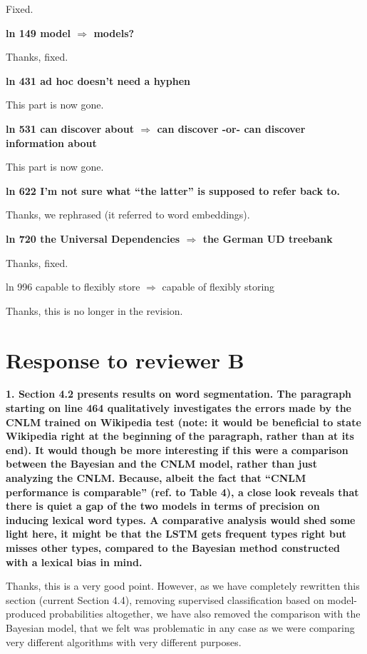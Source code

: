 \documentclass{article}
\begin{document}
Fixed.
\newline

\textbf{ln 149 model $\Rightarrow$ models?}

Thanks, fixed.
\newline

\textbf{ln 431 ad hoc doesn't need a hyphen}

This part is now gone.
\newline

\textbf{ln 531 can discover about $\Rightarrow$ can discover -or- can discover information
about}

This part is now gone.
\newline

\textbf{ln 622 I'm not sure what ``the latter'' is supposed to refer back to.}

Thanks, we rephrased (it referred to word embeddings).
\newline

\textbf{ln 720 the Universal Dependencies $\Rightarrow$ the German UD treebank}

Thanks, fixed.

ln 996 capable to flexibly store $\Rightarrow$ capable of flexibly storing

Thanks, this is no longer in the revision.


\section{Response to reviewer B}

\textbf{1. Section 4.2 presents results on word segmentation. The paragraph starting on line 464 qualitatively investigates the errors made by the CNLM trained on Wikipedia test (note: it would be beneficial to state Wikipedia right at the beginning of the paragraph, rather than at its end). It would though be more interesting if this were a comparison between the Bayesian and the CNLM model, rather than just analyzing the CNLM.  Because, albeit the fact that ``CNLM performance is comparable'' (ref. to Table 4), a close look reveals that there is quiet a gap of the two models in terms of precision on inducing lexical word types. A comparative analysis would shed some light here, it might be that the LSTM gets frequent types right but misses other types, compared to the Bayesian method constructed with a lexical bias in mind.}

Thanks, this is a very good point. However, as we have completely rewritten this section (current Section 4.4), removing supervised classification based on model-produced probabilities altogether, we have also removed the comparison with the Bayesian model, that we felt was problematic in any case as we were comparing very different algorithms with very different purposes.
\newline
\end{document}
